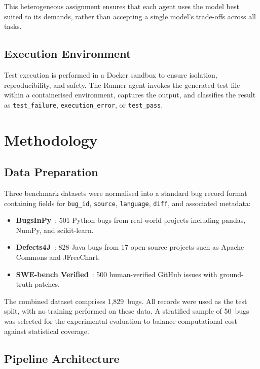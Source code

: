 \documentclass[conference]{IEEEtran}
\begin{document}
This heterogeneous assignment ensures that each agent uses the model best suited to its demands, rather than accepting a single model's trade-offs across all tasks.

\subsection{Execution Environment}

Test execution is performed in a Docker sandbox to ensure isolation, reproducibility, and safety. The Runner agent invokes the generated test file within a containerised environment, captures the output, and classifies the result as \texttt{test\_failure}, \texttt{execution\_error}, or \texttt{test\_pass}.

\section{Methodology}

\subsection{Data Preparation}

Three benchmark datasets were normalised into a standard bug record format containing fields for \texttt{bug\_id}, \texttt{source}, \texttt{language}, \texttt{diff}, and associated metadata:

\begin{itemize}
    \item \textbf{BugsInPy}~\cite{widyasari2020}: 501 Python bugs from real-world projects including pandas, NumPy, and scikit-learn.
    \item \textbf{Defects4J}~\cite{just2014}: 828 Java bugs from 17 open-source projects such as Apache Commons and JFreeChart.
    \item \textbf{SWE-bench Verified}~\cite{jimenez2024}: 500 human-verified GitHub issues with ground-truth patches.
\end{itemize}

The combined dataset comprises 1,829~bugs. All records were used as the test split, with no training performed on these data. A stratified sample of 50~bugs was selected for the experimental evaluation to balance computational cost against statistical coverage.

\subsection{Pipeline Architecture}
\end{document}
